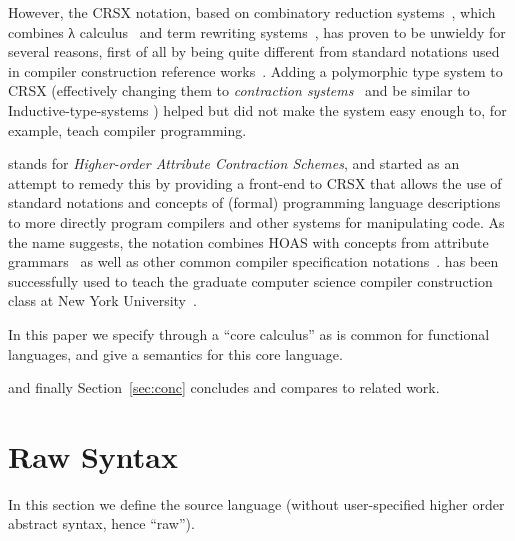 \documentclass[letterpaper,11pt]{article}
\begin{document}
However, the CRSX notation, based on combinatory reduction systems~\cite{Klop:1980,Klop+:tcs1993},
which combines λ calculus~\cite{Church:1941,Barendregt:1984} and term rewriting
systems~\cite{Klop:1992:Handbook}, has proven to be unwieldy for several reasons, first of all by
being quite different from standard notations used in compiler construction reference
works~\cite{Aho+:2006}. Adding a polymorphic type system to CRSX (effectively changing them to
\emph{contraction systems}~\cite{Aczel:1978} and be similar to Inductive-type-systems
\cite{BlanquiJouannaudOkada:tcs2002}) helped but did not make the system easy enough to, for
example, teach compiler programming.

\HAX stands for \emph{Higher-order Attribute Contraction Schemes}, and started as an attempt to
remedy this by providing a front-end to CRSX that allows the use of standard notations and concepts
of (formal) programming language descriptions to more directly program compilers and other systems
for manipulating code. As the name suggests, the notation combines HOAS with concepts from attribute
grammars~\cite{Knuth:mst1968} as well as other common compiler specification
notations~\cite{Aho+:2006}. \HAX has been successfully used to teach the graduate computer science
compiler construction class at New York University~\cite{RoseRose:cims2015}.

In this paper we specify \HAX through a ``core calculus'' as is common for functional languages, and
give a semantics for this core language.



and finally Section~\ref{sec:conc} concludes and compares to related work.



\section{Raw \HAX Syntax}
\label{sec:hacs}

In this section we define the \HAX source language (without user-specified higher order abstract
syntax, hence ``raw'').
\end{document}
